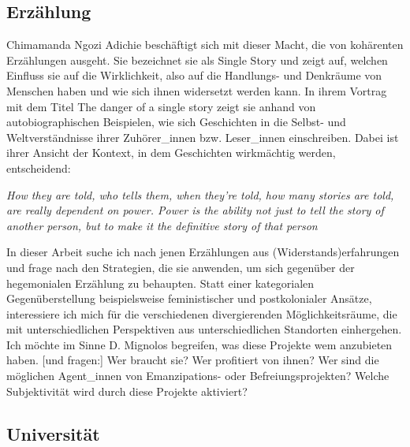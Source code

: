 \documentclass[11pt]{article}
\newenvironment{myenv}{\begin{adjustwidth}{2cm}{}}{\end{adjustwidth}}
\begin{document}
\subsection{Erzählung} Chimamanda Ngozi Adichie beschäftigt sich mit dieser
Macht, die von kohärenten Erzählungen ausgeht. Sie bezeichnet sie als Single
Story und zeigt auf, welchen Einfluss sie auf die Wirklichkeit, also auf die
Handlungs- und Denkräume von Menschen haben und wie sich ihnen widersetzt werden
kann. In ihrem Vortrag mit dem Titel \glqq The danger of a single story \grqq
zeigt sie anhand von autobiographischen Beispielen, wie sich Geschichten in die
Selbst- und Weltverständnisse ihrer Zuhörer\_innen bzw.  Leser\_innen
einschreiben. Dabei ist ihrer Ansicht der Kontext, in dem Geschichten
wirkmächtig werden, entscheidend: \begin{myenv}

  \textit{ \glqq How they are told, who tells them, when they're told, how many
stories are told, are really dependent on power. Power is the ability not just
to tell the story of another person, but to make it the definitive story of that
person \grqq \footnotemark {} } \end{myenv}

In dieser Arbeit suche ich nach jenen Erzählungen aus (Widerstands)erfahrungen
und frage nach den Strategien, die sie anwenden, um sich gegenüber der
hegemonialen Erzählung zu behaupten. Statt einer kategorialen Gegenüberstellung
beispielsweise feministischer und postkolonialer Ansätze, interessiere ich mich
für die verschiedenen divergierenden Möglichkeitsräume, die mit
unterschiedlichen Perspektiven aus unterschiedlichen Standorten einhergehen. Ich
möchte im Sinne D. Mignolos begreifen, \glqq [...] was diese Projekte wem
anzubieten haben. [und fragen:] Wer braucht sie? Wer profitiert von ihnen? Wer
sind die möglichen Agent\_innen von Emanzipations- oder Befreiungsprojekten?
Welche Subjektivität wird durch diese Projekte aktiviert? \grqq

\subsection{Universität}
\end{document}
